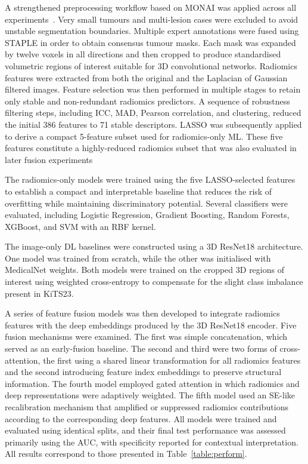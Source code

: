 \documentclass[final,british,a4paper,12pt]{phdthesis}
\begin{document}
A strengthened preprocessing workflow based on MONAI was applied across all experiments~\cite{cardoso2022monai}. Very small tumours and multi-lesion cases were excluded to avoid unstable segmentation boundaries. Multiple expert annotations were fused using STAPLE in order to obtain consensus tumour masks. Each mask was expanded by twelve voxels in all directions and then cropped to produce standardised volumetric regions of interest suitable for 3D convolutional networks. Radiomics features were extracted from both the original and the Laplacian of Gaussian filtered images. Feature selection was then performed in multiple stages to retain only stable and non-redundant radiomics predictors. A sequence of robustness filtering steps, including ICC, MAD, Pearson correlation, and clustering, reduced the initial 386 features to 71 stable descriptors. LASSO was subsequently applied to derive a compact 5-feature subset used for radiomics-only ML. These five features constitute a highly-reduced radiomics subset that was also evaluated in later fusion experiments

The radiomics-only models were trained using the five LASSO-selected features to establish a compact and interpretable baseline that reduces the risk of overfitting while maintaining discriminatory potential. Several classifiers were evaluated, including Logistic Regression, Gradient Boosting, Random Forests, XGBoost, and SVM with an RBF kernel.

The image-only DL baselines were constructed using a 3D ResNet18 architecture. One model was trained from scratch, while the other was initialised with MedicalNet weights. Both models were trained on the cropped 3D regions of interest using weighted cross-entropy to compensate for the slight class imbalance present in KiTS23.

A series of feature fusion models was then developed to integrate radiomics features with the deep embeddings produced by the 3D ResNet18 encoder. Five fusion mechanisms were examined. The first was simple concatenation, which served as an early-fusion baseline. The second and third were two forms of cross-attention, the first using a shared linear transformation for all radiomics features and the second introducing feature index embeddings to preserve structural information. The fourth model employed gated attention in which radiomics and deep representations were adaptively weighted. The fifth model used an SE-like recalibration mechanism that amplified or suppressed radiomics contributions according to the corresponding deep features. All models were trained and evaluated using identical splits, and their final test performance was assessed primarily using the AUC, with specificity reported for contextual interpretation. All results correspond to those presented in Table~\ref{table:perform}.
\end{document}
